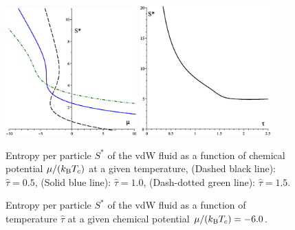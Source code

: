 \documentclass[12pt]{article}
\numberwithin{equation}{section}
\begin{document}
	\begin{figure}[htbp]
		\includegraphics[width=0.45\textwidth,angle=0]{vdw_S_vs_mu}
		\hfill
		\includegraphics[width=0.45\textwidth,angle=0]{vdw_S_vs_t_at_mu}
		\\
		\parbox{0.45\textwidth}{\caption{\label{fig:vdw_S_vs_mu} Entropy per particle $S^{*}$ of the vdW fluid as a function of chemical potential $\mu/(k_{\rm B}T_c)$ at a given temperature, (Dashed black line): $\hat{\tau}=0.5$, (Solid blue line): $\hat{\tau}=1.0$, (Dash-dotted green line): $\hat{\tau}=1.5$.}}
		\hfill
		\parbox{0.45\textwidth}{\caption{\label{fig:vdw_S_vs_t_at_mu} Entropy per particle $S^{*}$ of the vdW fluid as a function of temperature $\hat{\tau}$ at a given chemical potential $\mu/(k_{\rm B}T_c) = -6.0$.}}
	\end{figure}
	
	\pagebreak
	

	\pagebreak	
	
	
	
\end{document}
